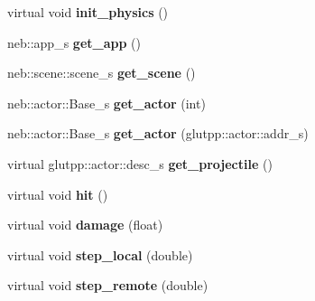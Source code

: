 \begin{DoxyCompactItemize}
\item 
\hypertarget{classneb_1_1actor_1_1Base_a7c2ceae5ca1218f608d869b4bc1b1632}{
virtual void {\bfseries init\_\-physics} ()}
\label{classneb_1_1actor_1_1Base_a7c2ceae5ca1218f608d869b4bc1b1632}

\item 
\hypertarget{classneb_1_1actor_1_1Base_ae3983e94b6e4311f9830fb257bdd430b}{
neb::app\_\-s {\bfseries get\_\-app} ()}
\label{classneb_1_1actor_1_1Base_ae3983e94b6e4311f9830fb257bdd430b}

\item 
\hypertarget{classneb_1_1actor_1_1Base_a9ecd15cc92581b224343e345533ceda8}{
neb::scene::scene\_\-s {\bfseries get\_\-scene} ()}
\label{classneb_1_1actor_1_1Base_a9ecd15cc92581b224343e345533ceda8}

\item 
\hypertarget{classneb_1_1actor_1_1Base_ac993b623947e201f01582ec038673809}{
neb::actor::Base\_\-s {\bfseries get\_\-actor} (int)}
\label{classneb_1_1actor_1_1Base_ac993b623947e201f01582ec038673809}

\item 
\hypertarget{classneb_1_1actor_1_1Base_a540879bddb079620e352719275346b15}{
neb::actor::Base\_\-s {\bfseries get\_\-actor} (glutpp::actor::addr\_\-s)}
\label{classneb_1_1actor_1_1Base_a540879bddb079620e352719275346b15}

\item 
\hypertarget{classneb_1_1actor_1_1Base_a6aea29e7c87c3bb8507d2e249fe18a9b}{
virtual glutpp::actor::desc\_\-s {\bfseries get\_\-projectile} ()}
\label{classneb_1_1actor_1_1Base_a6aea29e7c87c3bb8507d2e249fe18a9b}

\item 
\hypertarget{classneb_1_1actor_1_1Base_a83a135f3543d02c0bd8a6d32b6d1d386}{
virtual void {\bfseries hit} ()}
\label{classneb_1_1actor_1_1Base_a83a135f3543d02c0bd8a6d32b6d1d386}

\item 
\hypertarget{classneb_1_1actor_1_1Base_a4c2e2a30b3e7c801e9e4e04552e10b30}{
virtual void {\bfseries damage} (float)}
\label{classneb_1_1actor_1_1Base_a4c2e2a30b3e7c801e9e4e04552e10b30}

\item 
\hypertarget{classneb_1_1actor_1_1Base_af57cfb2160c8263244a2ee0bd9b4b254}{
virtual void {\bfseries step\_\-local} (double)}
\label{classneb_1_1actor_1_1Base_af57cfb2160c8263244a2ee0bd9b4b254}

\item 
\hypertarget{classneb_1_1actor_1_1Base_af82f96cdf3dd4c63a61d870a87ce06e1}{
virtual void {\bfseries step\_\-remote} (double)}
\label{classneb_1_1actor_1_1Base_af82f96cdf3dd4c63a61d870a87ce06e1}


\end{DoxyCompactItemize}
